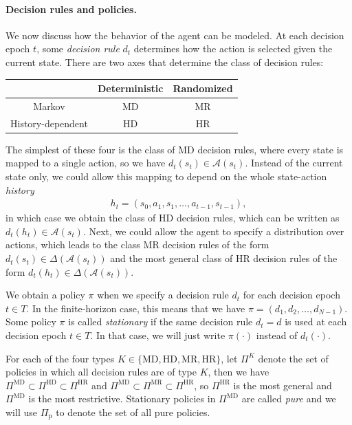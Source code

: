 \documentclass[11pt,a4paper]{article}
\theoremstyle{remark}
\begin{document}
\paragraph{Decision rules and policies.}

We now discuss how the behavior of the agent can be modeled. At each decision
epoch $t$, some \emph{decision rule} $d_t$ determines how the action is selected given
the current state.
%
There are two axes that determine the class of decision rules:
%
\begin{center}
\begin{tabular}{c|cc}
 & Deterministic & Randomized \\
\hline
Markov & MD & MR \\
History-dependent & HD & HR \\
\end{tabular}
\end{center}
%
The simplest of these four is the class of MD decision rules, where every state
is mapped to a single action, so we have $d_t(s_t) \in \mathcal{A}(s_t)$.
%
Instead of the current state only, we could allow this mapping to depend on the
whole state-action \emph{history}
\begin{align}
  \label{eq:1}
  h_t = (s_0, a_1, s_1, \dots, a_{t-1}, s_{t-1}) ,
\end{align}
in which case we obtain the class of HD decision rules, which can be written as
$d_t(h_t) \in \mathcal{A}(s_t)$.
%
Next, we could allow the agent to specify a distribution over actions, which
leads to the class MR decision rules of the form
$d_t(s_t) \in \Delta(\mathcal{A}(s_t))$ and the most general class of HR
decision rules of the form $d_t(h_t) \in \Delta(\mathcal{A}(s_t))$.

We obtain a policy $\pi$ when we specify a decision rule $d_t$ for each decision
epoch $t \in T$. In the finite-horizon case, this means that we have
$\pi = (d_1, d_2, \dots, d_{N-1})$. Some policy $\pi$ is called \emph{stationary} if the same
decision rule $d_t = d$ is used at each decision epoch $t \in T$. In that case, we
will just write $\pi(\cdot)$ instead of $d_t(\cdot)$.

For each of the four types $K \in \{\text{MD}, \text{HD}, \text{MR}, \text{HR}\}$,
let $\Pi^K$ denote the set of policies in which all decision rules are of type
$K$, then we have
$\Pi^\textrm{MD} \subset \Pi^\textrm{HD} \subset \Pi^\textrm{HR}$ and
$\Pi^\textrm{MD} \subset \Pi^\textrm{MR} \subset \Pi^\textrm{HR}$, so
$\Pi^\textrm{HR}$ is the most general and $\Pi^\textrm{MD}$ is the most
restrictive.
%
Stationary policies in $\Pi^\textrm{MD}$ are called \emph{pure} and we will use $\Pi_\mathrm{p}$ to denote the
set of all pure policies.
\end{document}
